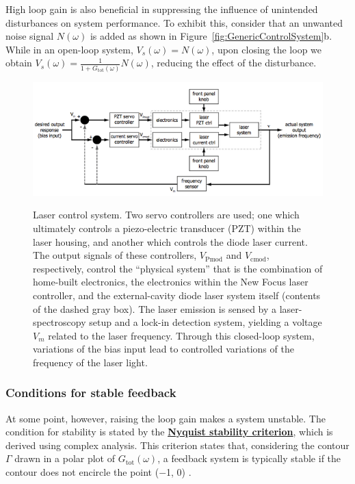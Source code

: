 \documentclass{../lab}
\begin{document}
High loop gain is also beneficial in suppressing the influence of unintended disturbances on system performance. To exhibit this, consider that an unwanted noise signal $N(\omega)$ is added as shown in Figure~\ref{fig:GenericControlSystem}b. While in an open-loop system, $V_s(\omega) = N(\omega)$, upon closing the loop we obtain $V_s(\omega) =\frac{1}{1+G_\text{tot}(\omega)} N(\omega)$, reducing the effect of the disturbance.

\begin{figure}[h]
    \centering
    \href{http://experimentationlab.berkeley.edu/sites/default/files/images/600px-MOTimage002.png}{\includegraphics[width=0.9\linewidth]{images/600px-MOTimage002.png}}
    \caption{Laser control system. Two servo controllers are used; one which ultimately controls a piezo-electric transducer (PZT) within the laser housing, and another which controls the diode laser current. The output signals of these controllers, $V_\text{Pmod}$ and $V_\text{cmod}$, respectively, control the ``physical system'' that is the combination of home-built electronics, the electronics within the New Focus laser controller, and the external-cavity diode laser system itself (contents of the dashed gray box). The laser emission is sensed by a laser-spectroscopy setup and a lock-in detection system, yielding a voltage $V_m$ related to the laser frequency. Through this closed-loop system, variations of the bias input lead to controlled variations of the frequency of the laser light.}
    \label{fig:LaserControlSystem}
\end{figure}

\subsubsection{Conditions for stable feedback}

At some point, however, raising the loop gain makes a system unstable. The condition for stability is stated by the \href{http://experimentationlab.berkeley.edu/sites/default/files/Definitions\%20for\%20MOT.pdf}{\textbf{Nyquist stability criterion}}, which is derived using complex analysis. This criterion states that, considering the contour $\Gamma$ drawn in a polar plot of $G_\text{tot}(\omega)$, a feedback system is typically stable if the contour does not encircle the point ($-$1, 0) \cite{PreciseCriterion}.
\end{document}
